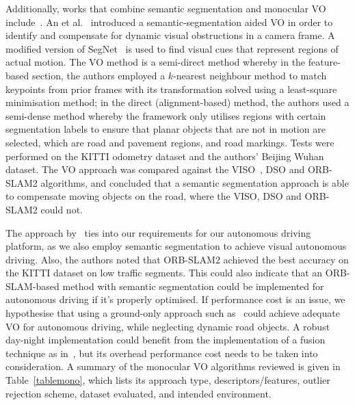 Additionally, works that combine semantic segmentation and monocular VO include~\cite{ros_vision-based_2015, an_semantic_2017}. An et al.~\cite{an_semantic_2017} introduced a semantic-segmentation aided VO in order to identify and compensate for dynamic visual obstructions in a camera frame. A modified version of SegNet~\cite{badrinarayanan_segnet:_2017} is used to find visual cues that represent regions of actual motion. The VO method is a semi-direct method whereby in the feature-based section, the authors employed a $k$-nearest neighbour method to match keypoints from prior frames with its transformation solved using a least-square minimisation method; in the direct (alignment-based) method, the authors used a semi-dense method whereby the framework only utilises regions with certain segmentation labels to ensure that planar objects that are not in motion are selected, which are road and pavement regions, and road markings. Tests were performed on the KITTI odometry dataset and the authors' Beijing Wuhan dataset. The VO approach was compared against the VISO~\cite{geiger_stereoscan:_2011}, DSO and ORB-SLAM2 algorithms, and concluded that a semantic segmentation approach is able to compensate moving objects on the road, where the VISO, DSO and ORB-SLAM2 could not. 

The approach by~\cite{an_semantic_2017} ties into our requirements for our autonomous driving platform, as we also employ semantic segmentation to achieve visual autonomous driving. Also, the authors noted that ORB-SLAM2 achieved the best accuracy on the KITTI dataset on low traffic segments. This could also indicate that an ORB-SLAM-based method with semantic segmentation could be implemented for autonomous driving if it's properly optimised. If performance cost is an issue, we hypothesise that using a ground-only approach such as~\cite{lee_online_2015} could achieve adequate VO for autonomous driving, while neglecting dynamic road objects. A robust day-night implementation could benefit from the implementation of a fusion technique as in~\cite{sappa_monocular_2016}, but its overhead performance cost needs to be taken into consideration. A summary of the monocular VO algorithms reviewed is given in Table~\ref{tablemono}, which lists its approach type, descriptors/features, outlier rejection scheme, dataset evaluated, and intended environment.

